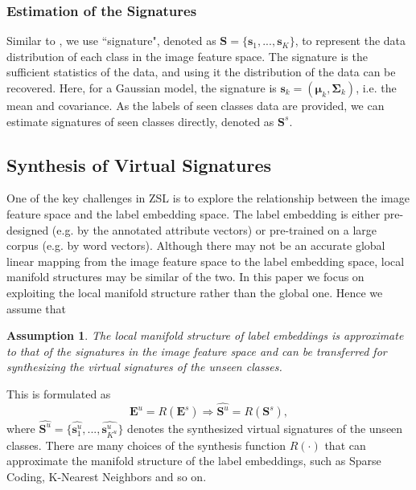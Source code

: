 \documentclass{article}
\newtheorem{as}{Assumption}
\begin{document}
\subsubsection{Estimation of the Signatures}
Similar to \cite{romera2015embarrassingly}, we use ``signature", denoted as $\bm{S}=\{\bm{s}_1,...,\bm{s}_K\}$, to represent the data distribution of each class in the image feature space. The signature is the sufficient statistics of the data, and using it the distribution of the data can be recovered. Here, for a Gaussian model, the signature is $\bm{s}_k =(\bm{\mu}_k ,\bm{\Sigma}_k)$, i.e. the mean and covariance. As the labels of seen classes data are provided, we can estimate signatures of seen classes directly, denoted as $\bm{S}^s$.
%
%
%


\subsection{Synthesis of Virtual Signatures}
One of the key challenges in ZSL is to explore the relationship between the image feature space and the label embedding space. The label embedding is either pre-designed (e.g. by the annotated attribute vectors) or pre-trained on a large corpus (e.g. by word vectors). Although there may not be an accurate global linear mapping from the image feature space to the label embedding space, local manifold structures may be similar of the two.
In this paper we focus on exploiting the local manifold structure rather than the global one. Hence we assume that
\begin{as}
\label{assum2}
The local manifold structure of label embeddings is approximate to that of the signatures in the image feature space and can be transferred for synthesizing the virtual signatures of the unseen classes.
\end{as}
This is formulated as
\begin{equation}
\bm{E}^u =R\left ( \bm{E}^s \right ) \Rightarrow \widehat{\bm{S}^u}=R\left ( \bm{S}^s \right),
\end{equation}
where $\widehat{\bm{S}^u}=\{\widehat{\bm{s}^u_1},...,\widehat{\bm{s}^u_{K^u}}\}$ denotes the synthesized virtual signatures of the unseen classes. There are many choices of the synthesis function $R(\cdot)$ that can approximate the manifold structure of the label embeddings, such as Sparse Coding, K-Nearest Neighbors and so on.
\end{document}

